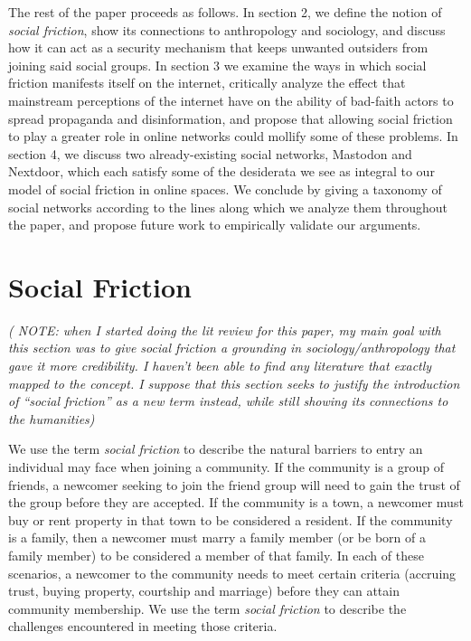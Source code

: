 \documentclass[sigconf,authordraft]{acmart}
\begin{document}
The rest of the paper proceeds as follows. In section 2, we define the notion of \textit{social friction}, show its connections to anthropology and sociology, and discuss how it can act as a security mechanism that keeps unwanted outsiders from joining said social groups. In section 3 we examine the ways in which social friction manifests itself on the internet, critically analyze the effect that mainstream perceptions of the internet have on the ability of bad-faith actors to spread propaganda and disinformation, and propose that allowing social friction to play a greater role in online networks could mollify some of these problems. In section 4, we discuss two already-existing social networks, Mastodon and Nextdoor, which each satisfy some of the desiderata we see as integral to our model of social friction in online spaces. We conclude by giving a taxonomy of social networks according to the lines along which we analyze them throughout the paper, and propose future work to empirically validate our arguments.  



\section{Social Friction}

\textit{(
NOTE: when I started doing the lit review for this paper, my main goal with this section was to give social friction a grounding in sociology/anthropology that gave it more credibility. I haven't been able to find any literature that exactly mapped to the concept. I suppose that this section seeks to justify the introduction of ``social friction'' as a new term instead, while still showing its connections to the humanities)}

We use the term {\itshape social friction} to describe the natural barriers to entry an individual may face when joining a community. If the community is a group of friends, a newcomer seeking to join the friend group will need to gain the trust of the group before they are accepted. If the community is a town, a newcomer must buy or rent property in that town to be considered a resident. If the community is a family, then a newcomer must marry a family member (or be born of a family member) to be considered a member of that family. In each of these scenarios, a newcomer to the community needs to meet certain criteria (accruing trust, buying property, courtship and marriage) before they can attain community membership. We use the term {\itshape social friction} to describe the challenges encountered in meeting those criteria. 
\end{document}
